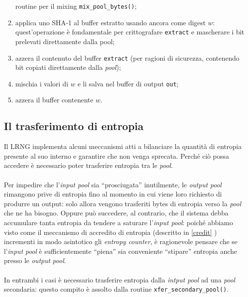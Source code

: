\documentclass{article}
\begin{document}
\begin{enumerate}
   routine per il mixing \verb+mix_pool_bytes()+;
   \item applica uno SHA-1 al buffer estratto usando ancora come digest $w$:
   quest'operazione è fondamentale per crittografare \verb+extract+ e mascherare i
   bit prelevati direttamente dalla pool;
   \item azzera il contenuto del buffer \verb+extract+ (per ragioni di sicurezza,
   contenendo bit copiati direttamente dalla \emph{pool});
   \item mischia i valori di $w$ e li salva nel buffer di output \verb+out+;
   \item azzera il buffer contenente $w$.
 \end{enumerate}
 
 \subsection{Il trasferimento di entropia}\label{trasferimentoentropia}
 Il LRNG implementa alcuni meccanismi atti a bilanciare la quantità di
 entropia presente al suo interno e garantire che non venga
 sprecata. Perché ciò possa accedere è necessario poter trasferire entropia tra
 le \emph{pool}.
  
 \paragraph{}Per impedire che l'\emph{input pool} sia
 ``prosciugata'' inutilmente, le \emph{output pool} rimangono prive di entropia
 fino al momento in cui viene loro richiesto di produrre un output: solo allora
 vengono trasferiti bytes di entropia verso la
 \emph{pool} che ne ha bisogno.
 Oppure può succedere, al contrario, che il sistema debba accumulare tanta
 entropia da tendere a saturare l'\emph{input pool}: poiché abbiamo visto come
 il meccanismo di accredito di entropia (descritto in \ref{credit} ) incrementi
 in modo asintotico gli \emph{entropy counter}, è ragionevole pensare che se
 l'\emph{input pool} è sufficientemente ``piena'' sia conveniente ``stipare''
 entropia anche presso le \emph{output pool}.
 
 \paragraph{}In entrambi i casi è necessario trasferire entropia dalla
 \emph{intput pool} ad una \emph{pool} secondaria: questo compito è assolto
 dalla routine \verb+xfer_secondary_pool()+.
 
 
\end{document}
